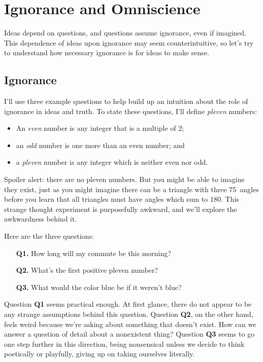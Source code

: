 \documentclass[9pt, twoside]{book}
\theoremstyle{argtstyle}
\begin{document}
%
%
%
%
%


\chapter{Ignorance and Omniscience}

Ideas depend on questions,
and questions assume ignorance,
even if imagined.
This dependence of ideas upon ignorance
may seem counterintuitive, so
let's try to understand how necessary ignorance
is for ideas to make sense.

\section{Ignorance}

I'll use three example questions
to help build up an intuition about the role of
ignorance in ideas and truth.
To state these questions, I'll define
{\em pleven} numbers:
\begin{itemize}
    \item An {\em even} number is any integer that is a multiple of 2;
    \item an {\em odd} number is one more than an even number; and
    \item a {\em pleven} number is any integer which is neither even nor odd.
\end{itemize}
Spoiler
alert: there are no pleven numbers.
But you might be able to imagine they exist, just as you might imagine there can
be a triangle with three 75\degree\ angles before you learn that all triangles
must have angles which sum to 180\degree.
This strange thought experiment is purposefully awkward, and we'll
explore the awkwardness behind it.

Here are the three questions:
\begin{enumerate}
    \item[{\bf Q1.}] How long will my commute be this morning?
    \item[{\bf Q2.}] What's the first positive pleven number?
    \item[{\bf Q3.}] What would the color blue be if it weren't blue?
\end{enumerate}
Question {\bf Q1} seems practical enough. At first glance, there do not appear
to be any strange assumptions behind this question.
Question {\bf Q2}, on the other hand, feels weird because we're asking about
something that doesn't exist. How can we answer a question of detail about a
nonexistent thing? Question {\bf Q3} seems to go one step further in this
direction,
being nonsensical unless we decide to think poetically or
playfully, giving up on taking ourselves literally.
\end{document}
